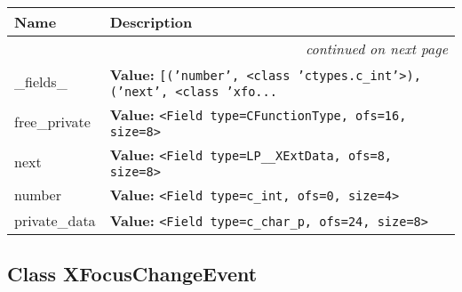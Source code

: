     \vspace{-1cm}
\hspace{\varindent}\begin{longtable}{|p{\varnamewidth}|p{\vardescrwidth}|l}
\cline{1-2}
\cline{1-2} \centering \textbf{Name} & \centering \textbf{Description}& \\
\cline{1-2}
\endhead\cline{1-2}\multicolumn{3}{r}{\small\textit{continued on next page}}\\\endfoot\cline{1-2}
\endlastfoot\raggedright \_\-f\-i\-e\-l\-d\-s\-\_\- & \raggedright \textbf{Value:} 
{\tt \texttt{[}\texttt{(}\texttt{'}\texttt{number}\texttt{'}\texttt{, }{\textless}class 'ctypes.c\_int'{\textgreater}\texttt{)}\texttt{, }\texttt{(}\texttt{'}\texttt{next}\texttt{'}\texttt{, }{\textless}class 'xfo\texttt{...}}&\\
\cline{1-2}
\raggedright f\-r\-e\-e\-\_\-p\-r\-i\-v\-a\-t\-e\- & \raggedright \textbf{Value:} 
{\tt {\textless}Field type=CFunctionType, ofs=16, size=8{\textgreater}}&\\
\cline{1-2}
\raggedright n\-e\-x\-t\- & \raggedright \textbf{Value:} 
{\tt {\textless}Field type=LP\_\_XExtData, ofs=8, size=8{\textgreater}}&\\
\cline{1-2}
\raggedright n\-u\-m\-b\-e\-r\- & \raggedright \textbf{Value:} 
{\tt {\textless}Field type=c\_int, ofs=0, size=4{\textgreater}}&\\
\cline{1-2}
\raggedright p\-r\-i\-v\-a\-t\-e\-\_\-d\-a\-t\-a\- & \raggedright \textbf{Value:} 
{\tt {\textless}Field type=c\_char\_p, ofs=24, size=8{\textgreater}}&\\
\cline{1-2}
\end{longtable}



\subsection{Class XFocusChangeEvent}

